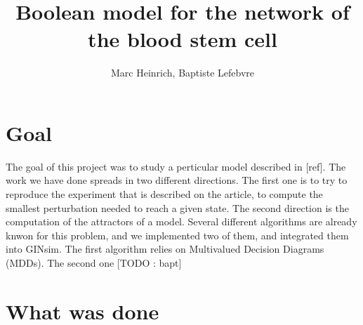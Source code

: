 \documentclass[a4paper,11pt]{article}
\author{Marc Heinrich, Baptiste Lefebvre}
\title{Boolean model for the network of the blood stem cell}
\begin{document}
\maketitle

\section{Goal}



The goal of this project was to study a perticular model described in [ref]. %
The work we have done spreads in two different directions. The first one is to try to reproduce the experiment that is described on the article, to compute the smallest perturbation needed to reach a given state. 
The second direction is the computation of the attractors of a model. Several different algorithms are already knwon for this problem, and we implemented two of them, and integrated them into GINsim. The first algorithm relies on Multivalued Decision Diagrams (MDDs). The second one [TODO : bapt]


\section{What was done}




\end{document}
